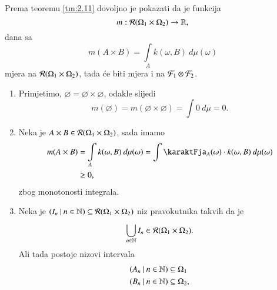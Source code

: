 \begin{rj}[\ref{zad:4.18}]
    Prema teoremu \ref{tm:2.11} dovoljno je pokazati da je funkcija
    \begin{equation*}
        m: \mathcal{R}({\Omega_1 \times \Omega_2}) \to \mathbb{R},
    \end{equation*}
    dana sa
    \begin{equation*}
        m (A \times B) = \int\limits_A k (\omega, B) \: d \mu (\omega)
    \end{equation*}
    mjera na $\mathcal{R}({\Omega_1 \times \Omega_2})$, tada \' ce biti mjera i na $\mathcal{F}_1 \otimes \mathcal{F}_2$.

    \begin{enumerate}[label=(\roman*)]
        \item \label{rj:4.18.1}
            Primjetimo, $\varnothing = \varnothing \times \varnothing$, odakle slijedi
            \begin{equation*}
                m (\varnothing) = m (\varnothing \times \varnothing) = \int 0 \: d \mu = 0.
            \end{equation*}
        \item \label{rj:4.18.2}
            Neka je $A \times B \in \mathcal{R}({\Omega_1 \times \Omega_2})$, sada imamo
            \begin{equation*}
                \begin{aligned}
                    m (A \times B) &= \int\limits_A k (\omega, B) \: d \mu (\omega) = \int \karaktFja_A (\omega) \cdot k (\omega, B) \: d \mu (\omega)\\
                    &\geq 0,
                \end{aligned}
            \end{equation*}
            zbog monotonosti integrala.
        \item \label{rj:4.18.3}
            Neka je $({I_n} \: | \: {n \in \mathbb{N}}) \subseteq \mathcal{R}({\Omega_1 \times \Omega_2})$ niz pravokutnika takvih da je
            \begin{equation*}
                \bigcup\limits_{n \in \mathbb{N}}^{} I_n \in \mathcal{R}({\Omega_1 \times \Omega_2}).
            \end{equation*}
            Ali tada postoje nizovi intervala
            \begin{equation*}
                \begin{aligned}
                    \niz{A_n}{n \in \nat} &\subseteq \Omega_1\\
                    \niz{B_n}{n \in \nat} &\subseteq \Omega_2,
                \end{aligned}

\end{equation*}
\end{enumerate}
\end{rj}
